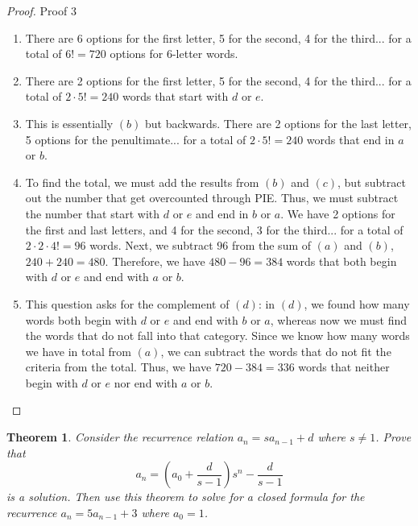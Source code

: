 \documentclass[11pt,titlepage]{article}		%
\theoremstyle{theorem}
\newtheorem{theorem}{Theorem}
\begin{document}
\begin{proof}
Proof 3
\begin{enumerate}[label=(\alph*)]
\item There are 6 options for the first letter, 5 for the second, 4 for the third... for a total of $6! = 720$ options for 6-letter words.
\item There are 2 options for the first letter, 5 for the second, 4 for the third... for a total of $2\cdot5! = 240$ words that start with $d$ or $e$.
\item This is essentially $(b)$ but backwards. There are 2 options for the last letter, 5 options for the penultimate... for a total of $2 \cdot 5!=240$ words that end in $a$ or $b$.
\item To find the total, we must add the results from $(b)$ and $(c)$, but subtract out the number that get overcounted through PIE. Thus, we must subtract the number that start with $d$ or $e$ and end in $b$ or $a$. We have 2 options for the first and last letters, and 4 for the second, 3 for the third... for a total of $2\cdot2\cdot4! = 96$ words. Next, we subtract $96$ from the sum of $(a)$ and $(b)$, $240 + 240 = 480$. Therefore, we have $480 - 96 = 384$ words that both begin with $d$ or $e$ and end with $a$ or $b$.
\item This question asks for the complement of $(d)$: in $(d)$, we found how many words both begin with $d$ or $e$ and end with $b$ or $a$, whereas now we must find the words that do not fall into that category. Since we know how many words we have in total from $(a)$, we can subtract the words that do not fit the criteria from the total. Thus, we have $720 - 384 = 336$ words that neither begin with $d$ or $e$ nor end with $a$ or $b$.
\end{enumerate}
\end{proof}

\clearpage

\begin{theorem}
    Consider the recurrence relation $a_n = s a_{n-1}+d$ where $s\ne 1$.
    Prove that
    \[
        a_n = \left(a_0 + \frac{d}{s-1}\right) s^n - \frac{d}{s-1}
    \]
    is a solution. Then use this theorem to solve for a closed formula for the recurrence $a_n = 5 a_{n-1} + 3$ where $a_0 = 1$.
\end{theorem}
\end{document}

